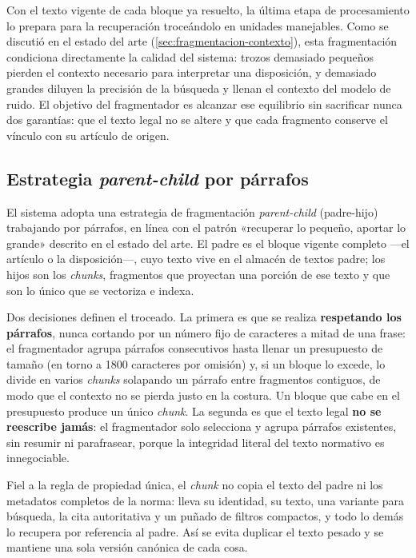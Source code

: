 Con el texto vigente de cada bloque ya resuelto, la última etapa de procesamiento lo prepara para la recuperación troceándolo en unidades manejables. Como se discutió en el estado del arte (\ref{sec:fragmentacion-contexto}), esta fragmentación condiciona directamente la calidad del sistema: trozos demasiado pequeños pierden el contexto necesario para interpretar una disposición, y demasiado grandes diluyen la precisión de la búsqueda y llenan el contexto del modelo de ruido. El objetivo del fragmentador es alcanzar ese equilibrio sin sacrificar nunca dos garantías: que el texto legal no se altere y que cada fragmento conserve el vínculo con su artículo de origen.

\subsection{Estrategia \emph{parent-child} por párrafos}
\label{subsec:chunking-estrategia}

El sistema adopta una estrategia de fragmentación \emph{parent-child} (padre-hijo) trabajando por párrafos, en línea con el patrón «recuperar lo pequeño, aportar lo grande» descrito en el estado del arte. El padre es el bloque vigente completo —el artículo o la disposición—, cuyo texto vive en el almacén de textos padre; los hijos son los \emph{chunks}, fragmentos que proyectan una porción de ese texto y que son lo único que se vectoriza e indexa.

Dos decisiones definen el troceado. La primera es que se realiza \textbf{respetando los párrafos}, nunca cortando por un número fijo de caracteres a mitad de una frase: el fragmentador agrupa párrafos consecutivos hasta llenar un presupuesto de tamaño (en torno a 1800 caracteres por omisión) y, si un bloque lo excede, lo divide en varios \emph{chunks} solapando un párrafo entre fragmentos contiguos, de modo que el contexto no se pierda justo en la costura. Un bloque que cabe en el presupuesto produce un único \emph{chunk}. La segunda es que el texto legal \textbf{no se reescribe jamás}: el fragmentador solo selecciona y agrupa párrafos existentes, sin resumir ni parafrasear, porque la integridad literal del texto normativo es innegociable.

Fiel a la regla de propiedad única, el \emph{chunk} no copia el texto del padre ni los metadatos completos de la norma: lleva su identidad, su texto, una variante para búsqueda, la cita autoritativa y un puñado de filtros compactos, y todo lo demás lo recupera por referencia al padre. Así se evita duplicar el texto pesado y se mantiene una sola versión canónica de cada cosa.

